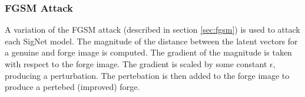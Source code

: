





\subsubsection{FGSM Attack}
A variation of the FGSM attack (described in section \ref{sec:fgsm}) is used to attack each SigNet model.
The magnitude of the distance between the latent vectors for a genuine and forge image is computed.
The gradient of the magnitude is taken with respect to the forge image.
The gradient is scaled by some constant $\epsilon$, producing a perturbation.
The pertebation is then added to the forge image to produce a pertebed (improved) forge.

